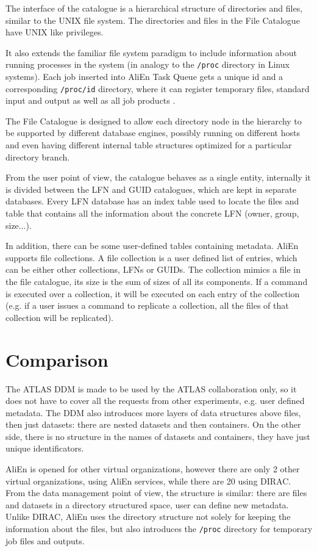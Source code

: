 The interface of the catalogue is a hierarchical structure of directories and
files, similar to the UNIX file system. The directories and files in the File
Catalogue have UNIX like privileges.

It also extends the familiar file system paradigm to include information about
running processes in the system (in analogy to the \texttt{/proc} directory in Linux
systems). Each job inserted into AliEn Task Queue gets a unique id and a
corresponding \texttt{/proc/id} directory, where it can register temporary files,
standard input and output as well as all job products \cite{AliEn1}.

The File Catalogue is designed to allow each directory node in the hierarchy to
be supported by different database engines, possibly running on different hosts
and even having different internal table structures optimized for a particular
directory branch. 

From the user point of view, the catalogue behaves as a single entity, internally
it is divided between the LFN and GUID catalogues, which are kept in separate
databases. Every LFN database has an index table used to locate the files and
table that contains all the information about the concrete LFN (owner, group,
size...).

In addition, there can be some user-defined tables containing metadata.
AliEn supports file collections.  A file collection is a user defined list of
entries, which can be either other collections, LFNs or GUIDs. The collection
mimics a file in the file catalogue, its size is the sum of sizes of
all its components. If a command is executed over a collection, it will be
executed on each entry of the collection (e.g. if a user issues a command to
replicate a collection, all the files of that collection will be replicated).

\section{Comparison}

The ATLAS DDM is made to be used by the ATLAS collaboration only, so it does not have to cover all the 
requests from other experiments, e.g. user defined metadata. The DDM also introduces more layers of data structures 
above files, then just datasets: there are nested datasets and then containers. On the other side, there is no
structure in the names of datasets and containers, they have just unique identificators. 

AliEn is opened for other virtual organizations, however there are only 2 other virtual organizations, using 
AliEn services, while there are 20 using DIRAC. From the data management point of view, the structure is similar:
there are files and datasets in a directory structured space, user can define new metadata. Unlike DIRAC, AliEn
uses the directory structure not solely for keeping the information about the files, but also introduces the 
\texttt{/proc} directory for temporary job files and outputs.